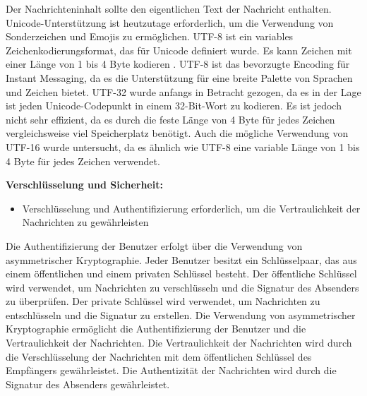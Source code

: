 \noindent Der Nachrichteninhalt sollte den eigentlichen Text der Nachricht enthalten. Unicode-Unterstützung ist heutzutage erforderlich, um die Verwendung von Sonderzeichen und Emojis zu ermöglichen. UTF-8 ist ein variables Zeichenkodierungsformat, das für Unicode definiert wurde. Es kann Zeichen mit einer Länge von 1 bis 4 Byte kodieren \parencite[S. 4]{rfc3629_utf-8}. UTF-8 ist das bevorzugte Encoding für Instant Messaging, da es die Unterstützung für eine breite Palette von Sprachen und Zeichen bietet. UTF-32 wurde anfangs in Betracht gezogen, da es in der Lage ist jeden Unicode-Codepunkt in einem 32-Bit-Wort zu kodieren. Es ist jedoch nicht sehr effizient, da es durch die feste Länge von 4 Byte für jedes Zeichen vergleichsweise viel Speicherplatz benötigt. Auch die mögliche Verwendung von UTF-16 wurde untersucht, da es ähnlich wie UTF-8 eine variable Länge von 1 bis 4 Byte für jedes Zeichen verwendet.


\noindent \textbf{Verschlüsselung und Sicherheit:}
\begin{itemize}
    \item Verschlüsselung und Authentifizierung erforderlich, um die Vertraulichkeit der Nachrichten zu gewährleisten
\end{itemize}

\noindent Die Authentifizierung der Benutzer erfolgt über die Verwendung von asymmetrischer Kryptographie. Jeder Benutzer besitzt ein Schlüsselpaar, das aus einem öffentlichen und einem privaten Schlüssel besteht. Der öffentliche Schlüssel wird verwendet, um Nachrichten zu verschlüsseln und die Signatur des Absenders zu überprüfen. Der private Schlüssel wird verwendet, um Nachrichten zu entschlüsseln und die Signatur zu erstellen. Die Verwendung von asymmetrischer Kryptographie ermöglicht die Authentifizierung der Benutzer und die Vertraulichkeit der Nachrichten. Die Vertraulichkeit der Nachrichten wird durch die Verschlüsselung der Nachrichten mit dem öffentlichen Schlüssel des Empfängers gewährleistet. Die Authentizität der Nachrichten wird durch die Signatur des Absenders gewährleistet. 